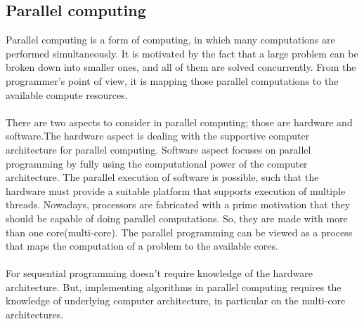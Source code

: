 \subsection{Parallel computing}
 Parallel computing is a form of computing, in which many computations are performed simultaneously. It is motivated by the fact that a large problem can be broken down into smaller ones, and all of them are solved concurrently. From the programmer’s point of view, it is mapping those parallel computations to the available compute resources.\paragraph*{}There are two aspects to consider in parallel computing; those are hardware and software.The hardware aspect is dealing with the supportive computer architecture for parallel computing. Software aspect focuses on parallel programming by fully using the computational power of the computer architecture. The parallel execution of software is possible, such that the hardware must provide a suitable platform that supports execution of multiple threads. Nowadays, processors are fabricated with a prime motivation that they should be capable of doing parallel computations. So, they are made with more than one core(multi-core). The parallel programming can be viewed as a process that maps the computation of a problem to the available cores.\paragraph*{}For sequential programming doesn’t require knowledge of the hardware architecture. But, implementing algorithms in parallel computing requires the knowledge of underlying computer architecture, in particular on the multi-core architectures.
